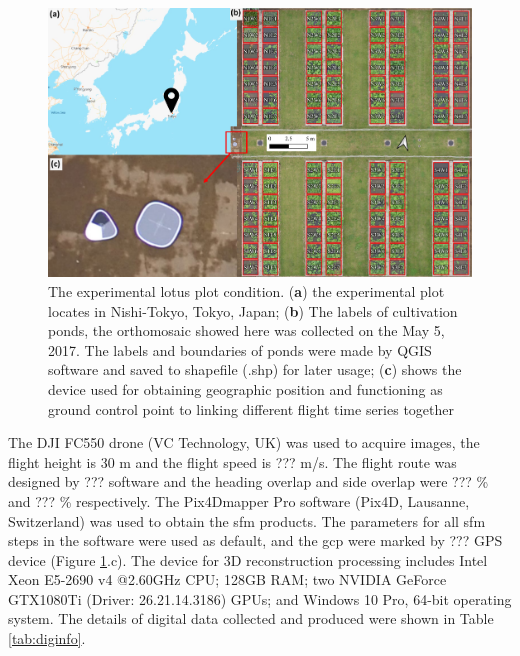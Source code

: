 \documentclass[sensors,article,submit,moreauthors, xelatex]{Definitions/mdpi}
\begin{document}
\begin{figure}[H]
  \centering
  \includegraphics[width=0.95\linewidth]{figures/map.pdf}
  \caption{The experimental lotus plot condition. (\textbf{a}) the experimental plot locates in Nishi-Tokyo, Tokyo, Japan; (\textbf{b}) The labels of cultivation ponds, the orthomosaic showed here was collected on the May 5, 2017. The labels and boundaries of ponds were made by QGIS software and saved to shapefile (\*.shp) for later usage; (\textbf{c}) shows the device used for obtaining geographic position and functioning as ground control point to linking different flight time series together}
  \label{fig:map}
\end{figure}

The DJI FC550 drone (VC Technology, UK) was used to acquire images, the flight height is 30 m and the flight speed is ??? m/s. The flight route was designed by ??? software and the heading overlap and side overlap were ??? \% and ??? \% respectively. The Pix4Dmapper Pro software (Pix4D, Lausanne, Switzerland) was used to obtain the \acrshort*{sfm} products. The parameters for all \acrshort*{sfm} steps in the software were used as default, and the \acrfull*{gcp} were marked by ??? GPS device (Figure \ref{fig:map}.c). The device for 3D reconstruction processing includes Intel Xeon E5-2690 v4 @2.60GHz CPU; 128GB RAM; two NVIDIA GeForce GTX1080Ti (Driver: 26.21.14.3186) GPUs; and Windows 10 Pro, 64-bit operating system. The details of digital data collected and produced were shown in Table \ref{tab:diginfo}.
\end{document}
